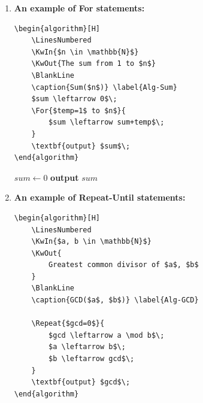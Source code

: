 \documentclass[12pt,a4paper]{article}
\begin{document}
\begin{enumerate}
        \newpage
    \item {\color{blue}\textbf{An example of For statements:}}

        \begin{minipage}[t]{0.5\textwidth}
\begin{verbatim}
\begin{algorithm}[H]
    \LinesNumbered
    \KwIn{$n \in \mathbb{N}$}
    \KwOut{The sum from 1 to $n$}
    \BlankLine
    \caption{Sum($n$)} \label{Alg-Sum}
    $sum \leftarrow 0$\;
    \For{$temp=1$ to $n$}{
        $sum \leftarrow sum+temp$\;
    }
    \textbf{output} $sum$\;
\end{algorithm}
\end{verbatim}
        \end{minipage}
        \hspace{2mm}
        \begin{minipage}[t]{0.4\textwidth}
            \begin{algorithm}[H]
                \LinesNumbered
                \BlankLine
                \caption{Sum($n$)} \label{Alg-Sum}
                $sum \leftarrow 0$\;
                \textbf{output} $sum$\;
            \end{algorithm}
        \end{minipage}

    \item {\color{blue}\textbf{An example of Repeat-Until statements:}}

        \begin{minipage}[t]{0.5\textwidth}
\begin{verbatim}
\begin{algorithm}[H]
    \LinesNumbered
    \KwIn{$a, b \in \mathbb{N}$}
    \KwOut{
        Greatest common divisor of $a$, $b$
    }
    \BlankLine
    \caption{GCD($a$, $b$)} \label{Alg-GCD}

    \Repeat{$gcd=0$}{
        $gcd \leftarrow a \mod b$\;
        $a \leftarrow b$\;
        $b \leftarrow gcd$\;
    }
    \textbf{output} $gcd$\;
\end{algorithm}
\end{verbatim}
        \end{minipage}
        \hspace{2mm}
        \begin{minipage}[t]{0.4\textwidth}
            \begin{algorithm}[H]
                \LinesNumbered
                \BlankLine
                \caption{GCD($a$, $b$)} \label{Alg-GCD}


\end{algorithm}
\end{minipage}
\end{enumerate}
\end{document}
